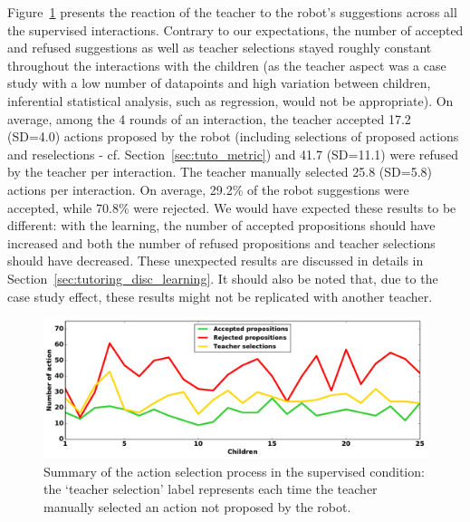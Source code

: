 Figure~\ref{fig:tutoring_supervision} presents the reaction of the teacher to the robot's suggestions across all the supervised interactions. Contrary to our expectations, the number of accepted and refused suggestions as well as teacher selections stayed roughly constant throughout the interactions with the children (as the teacher aspect was a case study with a low number of datapoints and high variation between children, inferential statistical analysis, such as regression, would not be appropriate). On average, among the 4 rounds of an interaction, the teacher accepted 17.2 (SD=4.0) actions proposed by the robot (including selections of proposed actions and reselections - cf. Section~\ref{sec:tuto_metric}) and 41.7 (SD=11.1) were refused by the teacher per interaction. The teacher manually selected 25.8 (SD=5.8) actions per interaction. On average, 29.2\% of the robot suggestions were accepted, while 70.8\% were rejected. We would have expected these results to be different: with the learning, the number of accepted propositions should have increased and both the number of refused propositions and teacher selections should have decreased. These unexpected results are discussed in details in Section~\ref{sec:tutoring_disc_learning}. It should also be noted that, due to the case study effect, these results might not be replicated with another teacher.

\begin{figure}[ht]
	\includegraphics[width=1\linewidth]{./summary_supervision.pdf}
	\centering
	\caption{Summary of the action selection process in the supervised condition: the `teacher selection' label represents each time the teacher manually selected an action not proposed by the robot.}
	\label{fig:tutoring_supervision}
\end{figure}


